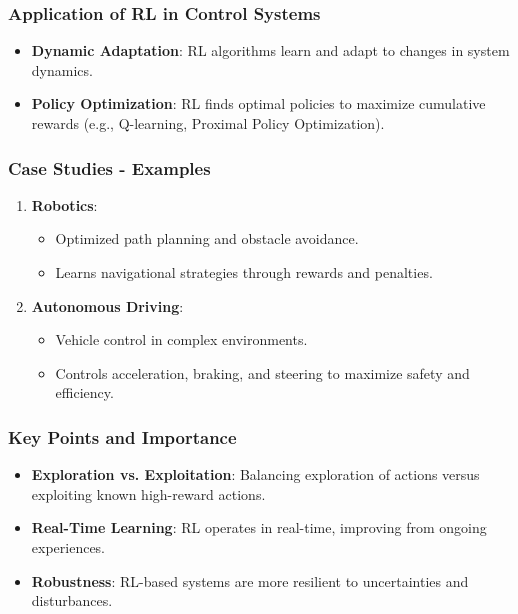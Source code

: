 \documentclass[aspectratio=169]{beamer}
\begin{document}
\begin{frame}[fragile]
    \frametitle{Application of RL in Control Systems}
    \begin{itemize}
        \item \textbf{Dynamic Adaptation}: RL algorithms learn and adapt to changes in system dynamics.
        \item \textbf{Policy Optimization}: RL finds optimal policies to maximize cumulative rewards (e.g., Q-learning, Proximal Policy Optimization).
    \end{itemize}
\end{frame}

\begin{frame}[fragile]
    \frametitle{Case Studies - Examples}
    \begin{enumerate}
        \item \textbf{Robotics}:
            \begin{itemize}
                \item Optimized path planning and obstacle avoidance.
                \item Learns navigational strategies through rewards and penalties.
            \end{itemize}
        \item \textbf{Autonomous Driving}:
            \begin{itemize}
                \item Vehicle control in complex environments.
                \item Controls acceleration, braking, and steering to maximize safety and efficiency.
            \end{itemize}
    \end{enumerate}
\end{frame}

\begin{frame}[fragile]
    \frametitle{Key Points and Importance}
    \begin{itemize}
        \item \textbf{Exploration vs. Exploitation}: Balancing exploration of actions versus exploiting known high-reward actions.
        \item \textbf{Real-Time Learning}: RL operates in real-time, improving from ongoing experiences.
        \item \textbf{Robustness}: RL-based systems are more resilient to uncertainties and disturbances.
    \end{itemize}
\end{frame}
\end{document}
